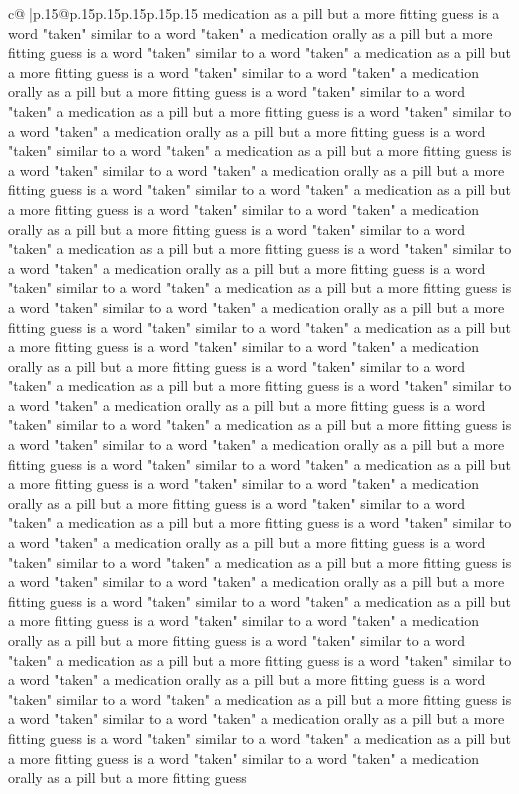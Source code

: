 \documentclass{article}
\begin{document}
{\begin{supertabular}{c@{$\;$}|p{.15\linewidth}@{}p{.15\linewidth}p{.15\linewidth}p{.15\linewidth}p{.15\linewidth}p{.15\linewidth}}
{{{medication as a pill but a more fitting guess is a word "taken" similar to a word "taken" a medication orally as a pill but a more fitting guess is a word "taken" similar to a word "taken" a medication as a pill but a more fitting guess is a word "taken" similar to a word "taken" a medication orally as a pill but a more fitting guess is a word "taken" similar to a word "taken" a medication as a pill but a more fitting guess is a word "taken" similar to a word "taken" a medication orally as a pill but a more fitting guess is a word "taken" similar to a word "taken" a medication as a pill but a more fitting guess is a word "taken" similar to a word "taken" a medication orally as a pill but a more fitting guess is a word "taken" similar to a word "taken" a medication as a pill but a more fitting guess is a word "taken" similar to a word "taken" a medication orally as a pill but a more fitting guess is a word "taken" similar to a word "taken" a medication as a pill but a more fitting guess is a word "taken" similar to a word "taken" a medication orally as a pill but a more fitting guess is a word "taken" similar to a word "taken" a medication as a pill but a more fitting guess is a word "taken" similar to a word "taken" a medication orally as a pill but a more fitting guess is a word "taken" similar to a word "taken" a medication as a pill but a more fitting guess is a word "taken" similar to a word "taken" a medication orally as a pill but a more fitting guess is a word "taken" similar to a word "taken" a medication as a pill but a more fitting guess is a word "taken" similar to a word "taken" a medication orally as a pill but a more fitting guess is a word "taken" similar to a word "taken" a medication as a pill but a more fitting guess is a word "taken" similar to a word "taken" a medication orally as a pill but a more fitting guess is a word "taken" similar to a word "taken" a medication as a pill but a more fitting guess is a word "taken" similar to a word "taken" a medication orally as a pill but a more fitting guess is a word "taken" similar to a word "taken" a medication as a pill but a more fitting guess is a word "taken" similar to a word "taken" a medication orally as a pill but a more fitting guess is a word "taken" similar to a word "taken" a medication as a pill but a more fitting guess is a word "taken" similar to a word "taken" a medication orally as a pill but a more fitting guess is a word "taken" similar to a word "taken" a medication as a pill but a more fitting guess is a word "taken" similar to a word "taken" a medication orally as a pill but a more fitting guess is a word "taken" similar to a word "taken" a medication as a pill but a more fitting guess is a word "taken" similar to a word "taken" a medication orally as a pill but a more fitting guess is a word "taken" similar to a word "taken" a medication as a pill but a more fitting guess is a word "taken" similar to a word "taken" a medication orally as a pill but a more fitting guess is a word "taken" similar to a word "taken" a medication as a pill but a more fitting guess is a word "taken" similar to a word "taken" a medication orally as a pill but a more fitting guess }}}
\end{supertabular}}
\end{document}

